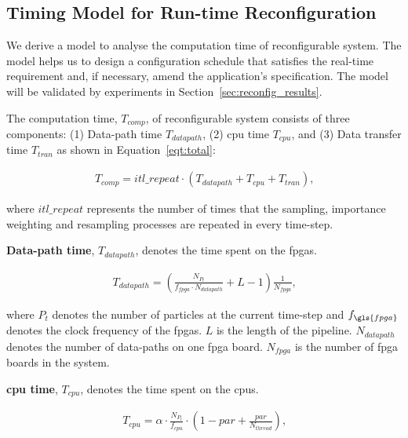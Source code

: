 \subsection{Timing Model for Run-time Reconfiguration}
\label{sec:reconfig_reconfig}

We derive a model to analyse the computation time of reconfigurable system.
The model helps us to design a configuration schedule that satisfies the real-time requirement and, if necessary, amend the application's specification.
The model will be validated by experiments in Section~\ref{sec:reconfig_results}.

The computation time, $T_{comp}$, of reconfigurable system consists of three components: (1) Data-path time $T_{datapath}$, (2) \gls{cpu} time $T_{cpu}$, and (3) Data transfer time $T_{tran}$ as shown in Equation~\ref{eqt:total}:

\begin{equation}
\begin{aligned}
T_{comp} = itl\_repeat \cdot \left ( T_{datapath} + T_{cpu} + T_{tran} \right ) \mbox{,}
\end{aligned}
\label{eqt:total}
\end{equation}

where $itl\_repeat$ represents the number of times that the sampling, importance weighting and resampling processes are repeated in every time-step.

\textbf{Data-path time}, $T_{datapath}$, denotes the time spent on the \glspl{fpga}.

\begin{equation}
\begin{aligned}
T_{datapath} = \left(\frac{{N_{P_t}}}{f_{fpga} \cdot N_{datapath}} + L - 1 \right) \frac{1}{N_{fpga}} \mbox{,}
\end{aligned}
\label{eqt:kernel}
\end{equation}

where $P_t$ denotes the number of particles at the current time-step and $f_{\gls{fpga}}$ denotes the clock frequency of the \glspl{fpga}.
$L$ is the length of the pipeline.
$N_{datapath}$ denotes the number of data-paths on one \gls{fpga} board.
$N_{fpga}$ is the number of \gls{fpga} boards in the system.

\textbf{\gls{cpu} time}, $T_{cpu}$, denotes the time spent on the \glspl{cpu}.

\begin{equation}
\begin{aligned}
T_{cpu} = \alpha \cdot \frac{{N_{P_t}}}{f_{cpu}} \cdot \left(1-par+\frac{par}{N_{thread}}\right) \mbox{,}
\end{aligned}
\label{eqt:host}
\end{equation}

